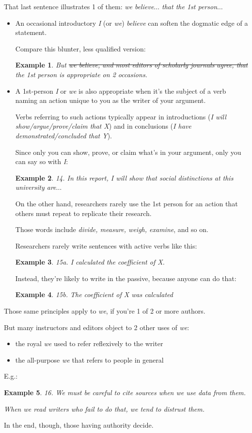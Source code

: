 \documentclass[oneside]{book}
\numberwithin{equation}{section}
\newtheorem{example}{Example}[section]
\begin{document}
That last sentence illustrates 1 of them: \textit{we believe$\ldots$ that the 1st person$\ldots$}
\begin{itemize}
    \item An occasional introductory \textit{I} (or \textit{we}) \textit{believe} can soften the dogmatic edge of a statement.
    
    Compare this blunter, less qualified version:
    \begin{example}
        But \st{we believe, and most editors of scholarly journals agree, that} the 1st person is appropriate on 2 occasions.
    \end{example}
    \item A 1st-person \textit{I} or \textit{we} is also appropriate when it's the subject of a verb naming an action unique to you as the writer of your argument.
    
    Verbs referring to such actions typically appear in introductions (\textit{I will show/argue/prove/claim that X}) and in conclusions (\textit{I have demonstrated/concluded that Y}).
    
    Since only you can show, prove, or claim what's in your argument, only you can say so with \textit{I}:
    \begin{example}
        14. In this report, I will show that social distinctions at this university are$\ldots$
    \end{example}
    On the other hand, researchers rarely use the 1st person for an action that others must repeat to replicate their research.
    
    Those words include \textit{divide, measure, weigh, examine}, and so on.
    
    Researchers rarely write sentences with active verbs like this:
    \begin{example}
        15a. I \emph{calculated} the coefficient of X.
    \end{example}
    Instead, they're likely to write in the passive, because anyone can do that:
    \begin{example}
        15b. The coefficient of X \emph{was calculated}
    \end{example}
\end{itemize}
Those same principles apply to \textit{we}, if you're 1 of 2 or more authors.

But many instructors and editors object to 2 other uses of \textit{we}:
\begin{itemize}
    \item the royal \textit{we} used to refer reflexively to the writer
    \item the all-purpose \textit{we} that refers to people in general
\end{itemize}
E.g.:
\begin{example}
    16. We must be careful to cite sources when we use data from them.
    
    When we read writers who fail to do that, we tend to distrust them.
\end{example}
In the end, though, those having authority decide.
\end{document}
